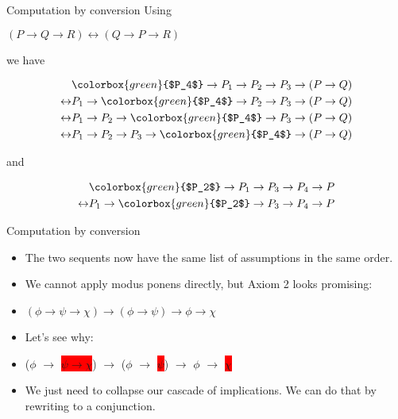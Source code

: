 \documentclass[presentation]{beamer}
\begin{document}
\begin{frame}[label={sec:orgheadline22}]{Computation by conversion}
Using 

\begin{center}
\((P \rightarrow Q \rightarrow R) \leftrightarrow (Q \rightarrow P \rightarrow R)\)
\end{center}

we have

\begin{align*}
                  &\colorbox{green}{$P_4$} \rightarrow P_1 \rightarrow P_2 \rightarrow P_3 \rightarrow (P \rightarrow Q)\\
  \leftrightarrow &P_1 \rightarrow \colorbox{green}{$P_4$} \rightarrow P_2 \rightarrow P_3 \rightarrow (P \rightarrow Q)\\
  \leftrightarrow &P_1 \rightarrow P_2 \rightarrow \colorbox{green}{$P_4$} \rightarrow P_3 \rightarrow (P \rightarrow Q)\\
  \leftrightarrow &P_1 \rightarrow P_2 \rightarrow P_3 \rightarrow \colorbox{green}{$P_4$} \rightarrow (P \rightarrow Q)
\end{align*}

and

\begin{align*}
                  &\colorbox{green}{$P_2$} \rightarrow P_1 \rightarrow P_3 \rightarrow P_4 \rightarrow P\\
  \leftrightarrow &P_1 \rightarrow \colorbox{green}{$P_2$} \rightarrow P_3 \rightarrow P_4 \rightarrow P
\end{align*}
\end{frame}

\begin{frame}[label={sec:orgheadline23}]{Computation by conversion}
\begin{itemize}
\item The two sequents now have the same list of assumptions in the same order.
\item We cannot apply modus ponens directly, but Axiom 2 looks promising:
\item \((\phi \rightarrow \psi \rightarrow \chi) \rightarrow (\phi
       \rightarrow \psi) \rightarrow \phi \rightarrow \chi\)
\item Let's see why:
\item (\(\phi\) \(\rightarrow\) \colorbox{red}{$\psi \rightarrow \chi$}) \(\rightarrow\) (\(\phi\)
     \(\rightarrow\) \colorbox{red}{$\psi$}) \(\rightarrow\) \(\phi\) \(\rightarrow\)
    \colorbox{red}{$\chi$}
\item We just need to collapse our cascade of implications. We can do that by rewriting
to a conjunction.
\end{itemize}
\end{frame}
\end{document}
